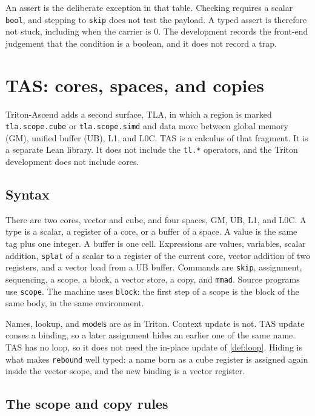 \documentclass[a4paper,UKenglish,anonymous,cleveref,autoref]{lipics-v2021}
\begin{document}
An assert is the deliberate exception in that table.
Checking requires a scalar \texttt{bool}, and stepping to \texttt{skip} does not test the payload.
A typed assert is therefore not stuck, including when the carrier is \(0\).
The development records the front-end judgement that the condition is a boolean, and it does not record a trap.

\section{TAS: cores, spaces, and copies}
\label{sec:tas}

Triton-Ascend adds a second surface, TLA, in which a region is marked \texttt{tla.scope.cube} or \texttt{tla.scope.simd} and data move between global memory (GM), unified buffer (UB), L1, and L0C.
TAS is a calculus of that fragment.
It is a separate Lean library.
It does not include the \texttt{tl.*} operators, and the Triton development does not include cores.

\subsection{Syntax}

There are two cores, vector and cube, and four spaces, GM, UB, L1, and L0C.
A type is a scalar, a register of a core, or a buffer of a space.
A value is the same tag plus one integer.
A buffer is one cell.
Expressions are values, variables, scalar addition, \texttt{splat} of a scalar to a register of the current core, vector addition of two registers, and a vector load from a UB buffer.
Commands are \texttt{skip}, assignment, sequencing, a scope, a block, a vector store, a copy, and \texttt{mmad}.
Source programs use \texttt{scope}.
The machine uses \texttt{block}: the first step of a scope is the block of the same body, in the same environment.

Names, lookup, and \(\mathsf{models}\) are as in Triton.
Context update is not.
TAS update conses a binding, so a later assignment hides an earlier one of the same name.
TAS has no loop, so it does not need the in-place update of \cref{def:loop}.
Hiding is what makes \texttt{rebound} well typed: a name born as a cube register is assigned again inside the vector scope, and the new binding is a vector register.

\subsection{The scope and copy rules}
\end{document}
